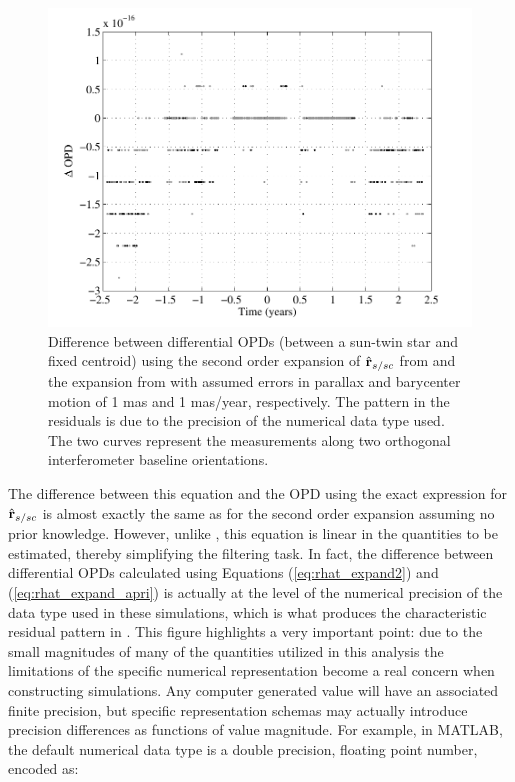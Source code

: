  \begin{figure}[ht]
\centering
\includegraphics[width=5.5in]{./figures/apri_expansion}
 \caption[Second order expansion of astrometric observation equation assuming prior knowledge]{Difference between differential OPDs (between a sun-twin star and fixed centroid) using the second order expansion of $\hat{\mathbf{r}}_{s/sc}$ from  and the  expansion from  with assumed errors in parallax and barycenter motion of 1 mas and 1 mas/year, respectively.  The pattern in the residuals is due to the precision of the numerical data type used. The two curves represent the measurements along two orthogonal interferometer baseline orientations. \label{fig:apri_expansion}}
\end{figure} 
The difference between this equation and the OPD using the exact  expression for  $\hat{\mathbf{r}}_{s/sc}$ is almost exactly the same as for the second order expansion assuming no prior knowledge.  However, unlike , this equation is linear in the quantities to be estimated, thereby simplifying the filtering task.   In fact, the difference between differential OPDs calculated using Equations (\ref{eq:rhat_expand2}) and (\ref{eq:rhat_expand_apri}) is actually at the level of the numerical precision of the data type used in these simulations, which is what produces the characteristic residual pattern in .  This figure highlights a very important point:  due to the small magnitudes of many of the quantities utilized in this analysis the limitations of the specific numerical representation become a real concern when constructing simulations.  Any computer generated value will have an associated finite precision, but specific representation schemas may actually introduce precision differences as functions of value magnitude.  For example, in MATLAB, the default numerical data type is a double precision, floating point number, encoded as:
